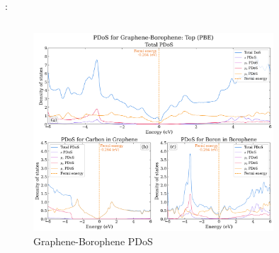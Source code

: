 \documentclass[xcolor=dvipsnames]{beamer}
\begin{document}
\begin{frame}{\insertsection: \insertsubsection}
\begin{columns}
\begin{column}{0.55\textwidth}
\begin{figure}
        \includegraphics[width=0.8\textwidth]{PDoS/G-Borophene_pdos.png}
        \caption{Graphene-Borophene PDoS}
    \end{figure}\end{column}
\end{columns}
\end{frame}
\end{document}
